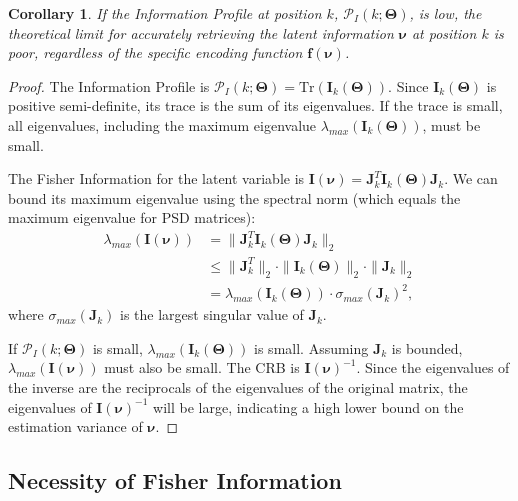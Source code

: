 \documentclass{article}
\newtheorem{corollary}[theorem]{Corollary}
\theoremstyle{definition}
\begin{document}
\begin{corollary}
\label{cor:information_bottleneck}
If the Information Profile at position $k$, $\mathcal{P}_I(k; \mathbf{\Theta})$, is low, the theoretical limit for accurately retrieving the latent information $\boldsymbol{\nu}$ at position $k$ is poor, regardless of the specific encoding function $\mathbf{f}(\boldsymbol{\nu})$.
\end{corollary}
\begin{proof}
The Information Profile is $\mathcal{P}_I(k; \mathbf{\Theta}) = \text{Tr}(\mathbf{I}_k(\mathbf{\Theta}))$. Since $\mathbf{I}_k(\mathbf{\Theta})$ is positive semi-definite, its trace is the sum of its eigenvalues. If the trace is small, all eigenvalues, including the maximum eigenvalue $\lambda_{max}(\mathbf{I}_k(\mathbf{\Theta}))$, must be small.

The Fisher Information for the latent variable is $\mathbf{I}(\boldsymbol{\nu}) = \mathbf{J}_k^T \mathbf{I}_k(\mathbf{\Theta}) \mathbf{J}_k$. We can bound its maximum eigenvalue using the spectral norm (which equals the maximum eigenvalue for PSD matrices):
\begin{align}
    \lambda_{max}(\mathbf{I}(\boldsymbol{\nu})) &= \|\mathbf{J}_k^T \mathbf{I}_k(\mathbf{\Theta}) \mathbf{J}_k\|_2 \\
    &\leq \|\mathbf{J}_k^T\|_2 \cdot \|\mathbf{I}_k(\mathbf{\Theta})\|_2 \cdot \|\mathbf{J}_k\|_2 \\
    &= \lambda_{max}(\mathbf{I}_k(\mathbf{\Theta})) \cdot \sigma_{max}(\mathbf{J}_k)^2,
\end{align}
where $\sigma_{max}(\mathbf{J}_k)$ is the largest singular value of $\mathbf{J}_k$.

If $\mathcal{P}_I(k; \mathbf{\Theta})$ is small, $\lambda_{max}(\mathbf{I}_k(\mathbf{\Theta}))$ is small. Assuming $\mathbf{J}_k$ is bounded, $\lambda_{max}(\mathbf{I}(\boldsymbol{\nu}))$ must also be small. The CRB is $\mathbf{I}(\boldsymbol{\nu})^{-1}$. Since the eigenvalues of the inverse are the reciprocals of the eigenvalues of the original matrix, the eigenvalues of $\mathbf{I}(\boldsymbol{\nu})^{-1}$ will be large, indicating a high lower bound on the estimation variance of $\boldsymbol{\nu}$.
\end{proof}

\subsection{Necessity of Fisher Information}
\end{document}
